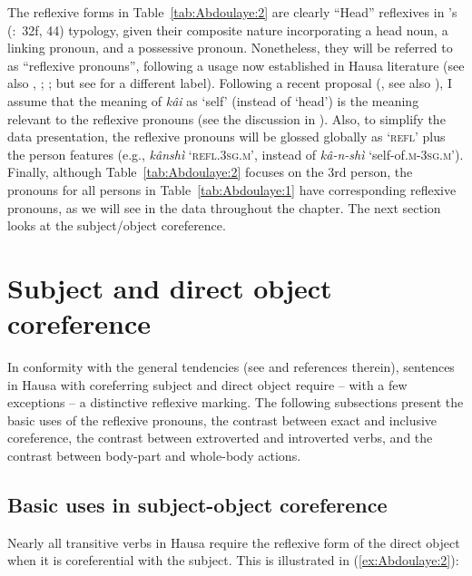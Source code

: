 \documentclass[output=paper]{langscibook}
\begin{document}
The reflexive forms in Table~\ref{tab:Abdoulaye:2} are clearly “Head” reflexives in \citeauthor{Faltz1985}'s (\citeyear{Faltz1985}:~32f, 44) typology, given their composite nature incorporating a head noun, a linking pronoun, and a possessive pronoun. Nonetheless, they will be referred to as “reflexive pronouns”, following a usage now established in Hausa literature (see also \citealt[74]{Caron1991}, \citealt[522]{Newman2000}; \citealt[413]{Jaggar2001}; but see \citealt[117]{Wolff1993} for a different label). Following a recent proposal (\citealt{Will2019}, see also \citealt[117]{Wolff1993}), I assume that the meaning of \textit{kâi} as ‘self’ (instead of ‘head’) is the meaning relevant to the reflexive pronouns (see the discussion in ). Also, to simplify the data presentation, the reflexive pronouns will be glossed globally as ‘\textsc{refl}’ plus the person features (e.g., \textit{kânshì} ‘\textsc{refl.3sg.m}’, instead of \textit{kâ-n-shì} ‘self-of.\textsc{m-3sg.m}’). Finally, although Table~\ref{tab:Abdoulaye:2} focuses on the 3rd person, the pronouns for all persons in Table~\ref{tab:Abdoulaye:1} have corresponding reflexive pronouns, as we will see in the data throughout the chapter. The next section looks at the subject/object coreference. 

\section{Subject and direct object coreference} \label{sec:Abdoulaye:3}

In conformity with the general tendencies (see \citealt[16]{Haspelmath2020a} and references therein), sentences in Hausa with coreferring subject and direct object require -- with a few exceptions -- a distinctive reflexive marking. The following subsections present the basic uses of the reflexive pronouns, the contrast between exact and inclusive coreference, the contrast between extroverted and introverted verbs, and the contrast between body-part and whole-body actions.

\subsection{Basic uses in subject-object coreference}\label{sec:Abdoulaye:3.1}

Nearly all transitive verbs in Hausa require the reflexive form of the direct object when it is coreferential with the subject. This is illustrated in (\ref{ex:Abdoulaye:2}):
\end{document}
